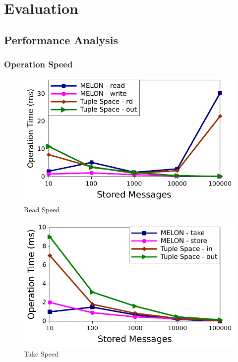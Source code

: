 \chapter{Evaluation}

\section{Performance Analysis}

\subsection{Operation Speed}

\begin{figure}
\centering
\includegraphics[width = \linewidth, clip, trim = 0px 0px 0px 0px]{figures/read_speed.pdf}
\caption{Read Speed}
\label{fig:readspeed}
\end{figure}

\begin{figure}
\centering
\includegraphics[width = \linewidth, clip, trim = 0px 0px 0px 0px]{figures/in_speed.pdf}
\caption{Take Speed}
\label{fig:takespeed}
\end{figure}

